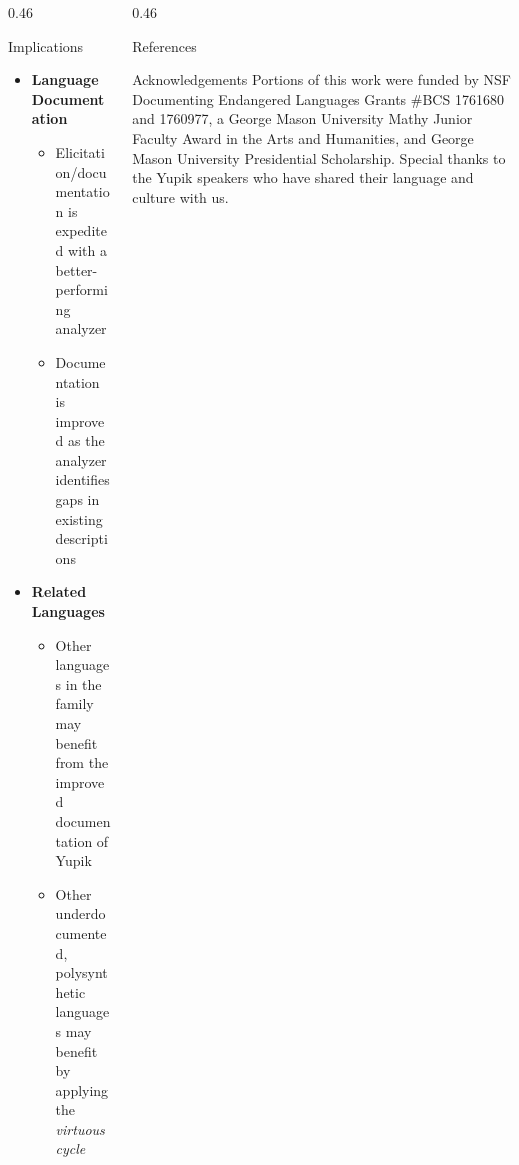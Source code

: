 \documentclass[usenames,dvipsnames]{beamer}
\begin{document}
\begin{frame}[fragile]
\begin{columns}[T]
\begin{column}{0.46\textwidth}
\begin{block}{Implications}
\begin{itemize}
\begin{itemize}
\begin{itemize}
                \item Analyzer facilitates development of computational resources for the community
            \end{itemize}
        
             \item \textbf{Language Documentation}
            \vspace{12pt}
            \begin{itemize}
            \setlength\itemsep{12pt}
                \item Elicitation/documentation is expedited with a better-performing analyzer
            
                \item Documentation is improved as the analyzer identifies gaps in existing descriptions
            \end{itemize}
                
            \item \textbf{Related Languages}
            \vspace{12pt}
            \begin{itemize}
            \setlength\itemsep{18pt}
                \item Other languages in the family may benefit from the improved documentation of Yupik
                
                \item Other underdocumented, polysynthetic languages may benefit by applying the \textit{virtuous cycle}
            \end{itemize}
    \end{itemize}
\end{itemize}

\end{block}
\end{column}

\begin{column}{0.46\textwidth}
\begin{block}{References}
\tiny
\nocite{*}

%

\end{block}
\begin{block}{Acknowledgements}
\tiny
Portions of this work were funded by NSF Documenting Endangered Languages Grants \#BCS 1761680 and 1760977, a George Mason University Mathy Junior Faculty Award in the Arts and Humanities, and George Mason University Presidential Scholarship. Special thanks to the Yupik speakers who have shared their language and culture with us.
\end{block}
\end{column}

\end{columns}

\end{frame}
\end{document}
